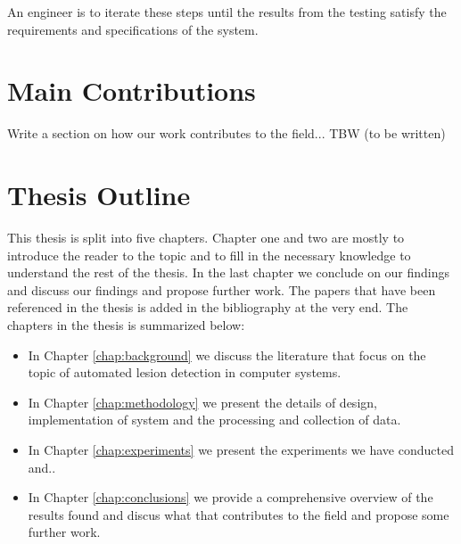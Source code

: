 \documentclass[thesis.tex]{subfiles}
\begin{document}
An engineer is to iterate these steps until the results from the testing satisfy the requirements and specifications of the system.


\section{Main Contributions} \label{sec:main_contributions}
Write a section on how our work contributes to the field... TBW (to be written)


\section{Thesis Outline} \label{sec:thesis_outline}
This thesis is split into five chapters. Chapter one and two are mostly to introduce the reader to the topic and to fill in the necessary knowledge to understand the rest of the thesis. In the last chapter we conclude on our findings and discuss our findings and propose further work. The papers that have been referenced in the thesis is added in the bibliography at the very end. The chapters in the thesis is summarized below:

\begin{itemize}
\item In Chapter \ref{chap:background} we discuss the literature that focus on the topic of automated lesion detection in computer systems.

\item In Chapter \ref{chap:methodology} we present the details of design, implementation of system and the processing and collection of data.

\item In Chapter \ref{chap:experiments} we present the experiments we have conducted and..

\item In Chapter \ref{chap:conclusions} we provide a comprehensive overview of the results found and discus what that contributes to the field and propose some further work.
\end{itemize}
\end{document}
